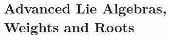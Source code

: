\part[Advanced Lie Algebras, Weights and Roots]{Advanced Lie Algebras,\\Weights and Roots}
\setcounter{chapter}{0} %
\renewcommand{\theHchapter}{modulo2.\arabic{chapter}} %











